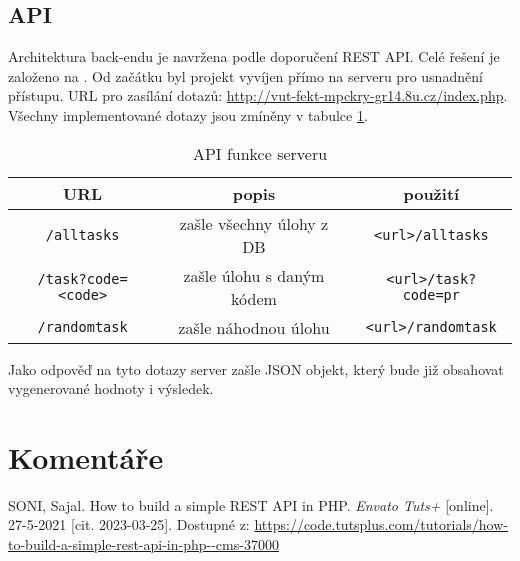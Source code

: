 \documentclass[titlepage]{article}
\begin{document}
 \subsection{API}
Architektura back-endu je navržena podle doporučení REST API. Celé řešení je založeno na \cite{restapi}. Od začátku byl projekt vyvíjen přímo na serveru pro usnadnění přístupu. URL pro zasílání dotazů: \url{http://vut-fekt-mpckry-gr14.8u.cz/index.php}. Všechny implementované dotazy jsou zmíněny v tabulce \ref{tab:api}.
\begin{table}[h!]
    \centering
    \caption{API funkce serveru} 
    \label{tab:api}
    \vspace{.5em}
    \begin{tabular}{|c|c|c|}
        \hline
        \textbf{URL} & \textbf{popis} & \textbf{použití} \\
        \hline \hline
        \texttt{/alltasks} & zašle všechny úlohy z DB & \texttt{<url>/alltasks} \\
        \hline
        \texttt{/task?code=<code>} &zašle úlohu s daným kódem & \texttt{<url>/task?code=pr} \\
        \hline
        \texttt{/randomtask} & zašle náhodnou úlohu & \texttt{<url>/randomtask}\\
        \hline
    \end{tabular}
\end{table}

Jako odpověď na tyto dotazy server zašle JSON objekt, který bude již obsahovat vygenerované hodnoty i výsledek. 

\section{Komentáře}



\begin{thebibliography}{9}
    SONI, Sajal. How to build a simple REST API in PHP. \emph{En\-va\-to Tuts+} [on\-li\-ne]. 27-5-2021 [cit. 2023-03-25]. Dostupné z: \url{https://code.tutsplus.com/tutorials/how-to-build-a-simple-rest-api-in-php--cms-37000}
\end{thebibliography}

    
\end{document}
